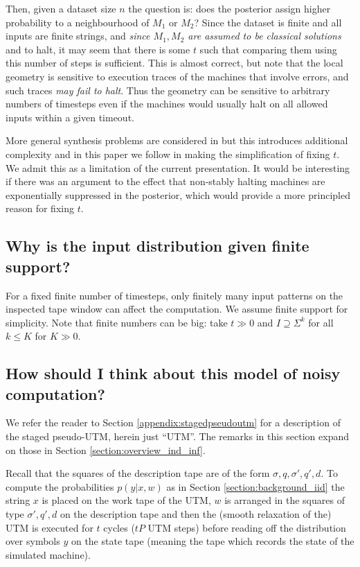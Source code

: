 \documentclass[english,letter paper,12pt,reqno]{article}
\theoremstyle{definition}
\begin{document}
Then, given a dataset size $n$ the question is: does the posterior assign higher probability to a neighbourhood of $M_1$ or $M_2$? Since the dataset is finite and all inputs are finite strings, and \emph{since $M_1, M_2$ are assumed to be classical solutions} and to halt, it may seem that there is some $t$ such that comparing them using this number of steps is sufficient. This is almost correct, but note that the local geometry is sensitive to execution traces of the machines that involve errors, and such traces \emph{may fail to halt}. Thus the geometry can be sensitive to arbitrary numbers of timesteps even if the machines would usually halt on all allowed inputs within a given timeout.

More general synthesis problems are considered in \cite{clift2018derivatives,waring2021geometric} but this introduces additional complexity and in this paper we follow \cite{clift2021geometry} in making the simplification of fixing $t$. We admit this as a limitation of the current presentation. It would be interesting if there was an argument to the effect that non-stably halting machines are exponentially suppressed in the posterior, which would provide a more principled reason for fixing $t$.

\subsection{Why is the input distribution given finite support?}

For a fixed finite number of timesteps, only finitely many input patterns on the inspected tape window can affect the computation. We assume finite support for simplicity. Note that finite numbers can be big: take $t \gg 0$ and $I \supseteq \Sigma^k$ for all $k \le K$ for $K \gg 0$.

\subsection{How should I think about this model of noisy computation?}\label{section:think_noisy}

We refer the reader to Section \ref{appendix:stagedpseudoutm} for a description of the staged pseudo-UTM, herein just ``UTM''. The remarks in this section expand on those in Section \ref{section:overview_ind_inf}.

Recall that the squares of the description tape are of the form $\sigma, q, \sigma', q', d$. To compute the probabilities $p(y|x,w)$ as in Section \ref{section:background_iid} the string $x$ is placed on the work tape of the UTM, $w$ is arranged in the squares of type $\sigma', q', d$ on the description tape and then the (smooth relaxation of the) UTM is executed for $t$ cycles ($tP$ UTM steps) before reading off the distribution over symbols $y$ on the state tape (meaning the tape which records the state of the simulated machine).
\end{document}
